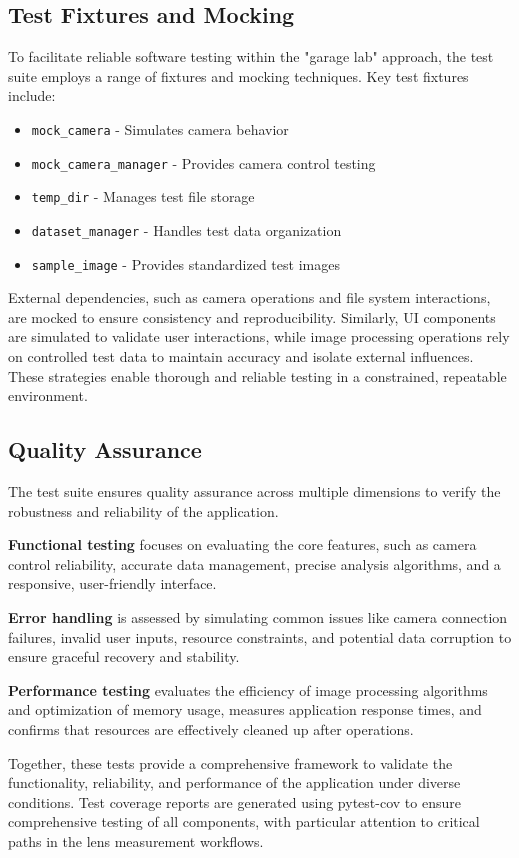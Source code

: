 \subsection{Test Fixtures and Mocking}
To facilitate reliable software testing within the "garage lab" approach, the test suite employs a range of fixtures and mocking techniques. Key test fixtures include:

\begin{itemize}
    \item \texttt{mock\_camera} - Simulates camera behavior
    \item \texttt{mock\_camera\_manager} - Provides camera control testing
    \item \texttt{temp\_dir} - Manages test file storage
    \item \texttt{dataset\_manager} - Handles test data organization
    \item \texttt{sample\_image} - Provides standardized test images
\end{itemize}

External dependencies, such as camera operations and file system interactions, are mocked to ensure consistency and reproducibility. Similarly, UI components are simulated to validate user interactions, while image processing operations rely on controlled test data to maintain accuracy and isolate external influences. These strategies enable thorough and reliable testing in a constrained, repeatable environment.

\subsection{Quality Assurance}
The test suite ensures quality assurance across multiple dimensions to verify the robustness and reliability of the application. 

\textbf{Functional testing} focuses on evaluating the core features, such as camera control reliability, accurate data management, precise analysis algorithms, and a responsive, user-friendly interface. 

\textbf{Error handling} is assessed by simulating common issues like camera connection failures, invalid user inputs, resource constraints, and potential data corruption  to ensure graceful recovery and stability. 

\textbf{Performance testing} evaluates the efficiency of image processing algorithms and optimization of memory usage, measures application response times, and confirms that resources are effectively cleaned up after operations. 

Together, these tests provide a comprehensive framework to validate the functionality, reliability, and performance of the application under diverse conditions. Test coverage reports are generated using pytest-cov to ensure comprehensive testing of all components, with particular attention to critical paths in the lens measurement workflows.


